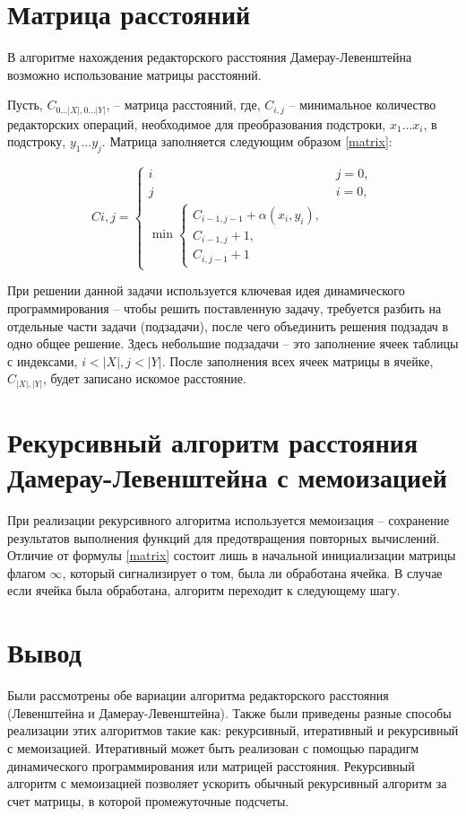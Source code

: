 \section{Матрица расстояний}
В алгоритме нахождения редакторского расстояния Дамерау-Левенштейна возможно использование матрицы расстояний.

Пусть, $C_{0 \dots |X|, 0 \dots |Y|}$, -- матрица расстояний, где, $C_{i, j}$ -- минимальное количество редакторских операций, необходимое для преобразования подстроки, $x_1\dots x_i$, в подстроку, $y_1 \dots y_j$.
Матрица заполняется следующим образом \ref{matrix}:

\begin{equation}
    \label{matrix}
	C{i, j} = 
	\begin{cases}
		i & j = 0, \\
		j & i = 0, \\
		\min 
		\begin{cases}
			C_{i - 1, j - 1} + \alpha(x_i, y_i), \\
			C_{i - 1, j} + 1, \\
			C_{i, j - 1} + 1
		\end{cases}
	\end{cases}
\end{equation}

При решении данной задачи используется ключевая идея динамического программирования -- чтобы решить поставленную задачу, требуется разбить на отдельные части задачи (подзадачи), после чего объединить решения подзадач в одно общее решение.
Здесь небольшие подзадачи -- это заполнение ячеек таблицы с индексами, $i < |X|, j < |Y|$.
После заполнения всех ячеек матрицы в ячейке, $C_{|X|, |Y|}$, будет записано искомое расстояние.

\section{Рекурсивный алгоритм расстояния Дамерау-Левенштейна с мемоизацией}

При реализации рекурсивного алгоритма используется мемоизация -- сохранение результатов выполнения функций для предотвращения повторных вычислений.
Отличие от формулы \ref{matrix} состоит лишь в начальной инициализации матрицы флагом $\infty$, который сигнализирует о том, была ли обработана ячейка.
В случае если ячейка была обработана, алгоритм переходит к следующему шагу. 

\section*{Вывод}

Были рассмотрены обе вариации алгоритма редакторского расстояния (Левенштейна и Дамерау-Левенштейна).
Также были приведены разные способы реализации этих алгоритмов такие как: рекурсивный, итеративный и рекурсивный с мемоизацией.
Итеративный может быть реализован с помощью парадигм динамического программирования или матрицей расстояния.
Рекурсивный алгоритм с мемоизацией позволяет ускорить обычный рекурсивный алгоритм за счет матрицы, в которой промежуточные подсчеты.

